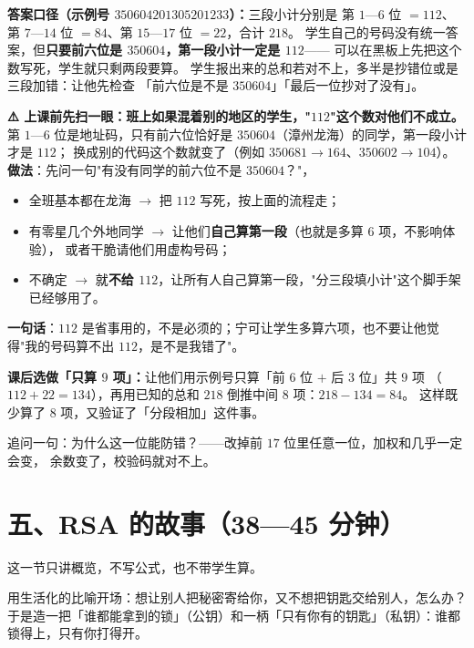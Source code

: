 \begin{zhu}
  \textbf{答案口径（示例号 \(350604201305201233\)）：}三段小计分别是
  第 \(1\)—\(6\) 位 \(=112\)、第 \(7\)—\(14\) 位 \(=84\)、第 \(15\)—\(17\) 位 \(=22\)，合计 \(218\)。
  学生自己的号码没有统一答案，但\textbf{只要前六位是 \(350604\)，第一段小计一定是 \(112\)}——
  可以在黑板上先把这个数写死，学生就只剩两段要算。
  学生报出来的总和若对不上，多半是抄错位或是三段加错：让他先检查
  「前六位是不是 \(350604\)」「最后一位抄对了没有」。
\end{zhu}

\begin{zhu}
  \textbf{⚠️ 上课前先扫一眼：班上如果混着别的地区的学生，"\(112\)"这个数对他们不成立。}
  第 \(1\)—\(6\) 位是地址码，只有前六位恰好是 \(350604\)（漳州龙海）的同学，第一段小计才是 \(112\)；
  换成别的代码这个数就变了（例如 \(350681\to164\)、\(350602\to104\)）。
  \textbf{做法}：先问一句"有没有同学的前六位不是 \(350604\)？"，
  \begin{itemize}
    \item 全班基本都在龙海 \(\to\) 把 \(112\) 写死，按上面的流程走；
    \item 有零星几个外地同学 \(\to\) 让他们\textbf{自己算第一段}（也就是多算 6 项，不影响体验），
      或者干脆请他们用虚构号码；
    \item 不确定 \(\to\) 就\textbf{不给 \(112\)}，让所有人自己算第一段，"分三段填小计"这个脚手架已经够用了。
  \end{itemize}
  \textbf{一句话}：\(112\) 是省事用的，不是必须的；宁可让学生多算六项，也不要让他觉得"我的号码算不出 \(112\)，是不是我错了"。
\end{zhu}

\begin{zhu}
  \textbf{课后选做「只算 \(9\) 项」：}让他们用示例号只算「前 \(6\) 位 \(+\) 后 \(3\) 位」共 \(9\) 项
  （\(112+22=134\)），再用已知的总和 \(218\) 倒推中间 \(8\) 项：\(218-134=84\)。
  这样既少算了 \(8\) 项，又验证了「分段相加」这件事。
\end{zhu}

追问一句：为什么这一位能防错？——改掉前 \(17\) 位里任意一位，加权和几乎一定会变，
余数变了，校验码就对不上。

\section*{五、RSA 的故事（38—45 分钟）}

\noindent 这一节只讲概览，不写公式，也不带学生算。

\begin{caozuo}
  用生活化的比喻开场：想让别人把秘密寄给你，又不想把钥匙交给别人，怎么办？
  于是造一把「谁都能拿到的锁」（公钥）和一柄「只有你有的钥匙」（私钥）：谁都锁得上，只有你打得开。
\end{caozuo}

